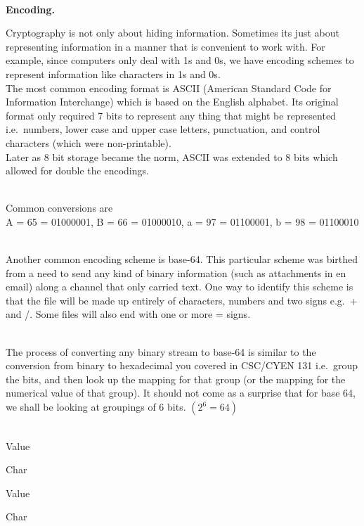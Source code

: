 \documentclass[
  letterpaper,
  DIV=11,
  numbers=noendperiod]{scrartcl}
\makeatletter
\let\oldparagraph\paragraph
\renewcommand{\paragraph}{
    \@ifstar
      \xxxParagraphStar
      \xxxParagraphNoStar
  }
\newcommand{\xxxParagraphStar}[1]{\oldparagraph*{#1}\mbox{}}
\newcommand{\xxxParagraphNoStar}[1]{\oldparagraph{#1}\mbox{}}
\makeatother
\begin{document}
\paragraph{\texorpdfstring{\textbf{Encoding.}}{Encoding.}}\label{encoding.}

Cryptography is not only about hiding information. Sometimes its just
about representing information in a manner that is convenient to work
with. For example, since computers only deal with 1s and 0s, we have
encoding schemes to represent information like characters in 1s and
0s.\\
The most common encoding format is ASCII (American Standard Code for
Information Interchange) which is based on the English alphabet. Its
original format only required 7 bits to represent any thing that might
be represented i.e.~numbers, lower case and upper case letters,
punctuation, and control characters (which were non-printable).\\

Later as 8 bit storage became the norm, ASCII was extended to 8 bits
which allowed for double the encodings.\\
\strut \\
Common conversions are\\
A = 65 = 01000001, B = 66 = 01000010, a = 97 = 01100001, b = 98 =
01100010\\
\strut \\
Another common encoding scheme is base-64. This particular scheme was
birthed from a need to send any kind of binary information (such as
attachments in en email) along a channel that only carried text. One way
to identify this scheme is that the file will be made up entirely of
characters, numbers and two signs e.g.~+ and /. Some files will also end
with one or more = signs.\\
\strut \\
The process of converting any binary stream to base-64 is similar to the
conversion from binary to hexadecimal you covered in CSC/CYEN 131
i.e.~group the bits, and then look up the mapping for that group (or the
mapping for the numerical value of that group). It should not come as a
surprise that for base 64, we shall be looking at groupings of 6 bits.
\((2^6 = 64)\)\\
\strut \\

Value

Char

Value

Char
\end{document}

